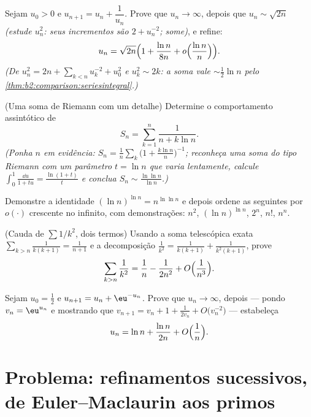 \begin{exercise}[$\star\star\star$]\label{exo:b2:comparison:8}
Sejam $u_0 > 0$ e $u_{n+1} = u_n + \dfrac{1}{u_n}$. Prove que $u_n
\to \infty$, depois que $u_n \sim \sqrt{2n}$ \emph{(estude $u_n^2$:
seus incrementos são $2 + u_n^{-2}$; some)}, e refine:
\[
u_n = \sqrt{2n}\Bigl(1 + \frac{\ln n}{8n} +
o\Bigl(\frac{\ln n}{n}\Bigr)\Bigr).
\]
\emph{(De $u_n^2 = 2n + \sum_{k<n} u_k^{-2} + u_0^2$ e $u_k^2
\sim 2k$: a soma vale $\sim \frac12\ln n$ pelo
\cref{thm:b2:comparison:seriesintegral}.)}
\end{exercise}

\begin{exercise}[$\star\star\star$]\label{exo:b2:comparison:9}
(Uma soma de Riemann com um detalhe) Determine o comportamento assintótico de
\[
S_n = \sum_{k=1}^{n} \frac{1}{n + k\ln n} .
\]
\emph{(Ponha $n$ em evidência: $S_n = \frac1n\sum_k \bigl(1 +
\frac{k\ln n}{n}\bigr)^{-1}$; reconheça uma soma do tipo Riemann com um
parâmetro $t = \ln n$ que varia lentamente, calcule $\int_0^1
\frac{\dd u}{1 + tu} = \frac{\ln(1+t)}{t}$ e conclua $S_n \sim
\frac{\ln\ln n}{\ln n}$.)}
\end{exercise}

\begin{exercise}[$\star$]\label{exo:b2:comparison:10}
Demonstre a identidade $(\ln n)^{\ln n} = n^{\ln\ln n}$ e depois ordene as
seguintes por $o(\cdot)$ crescente no infinito, com
demonstrações: $n^2$, $(\ln n)^{\ln n}$, $2^n$, $n!$, $n^n$.
\end{exercise}

\begin{exercise}[$\star\star$]\label{exo:b2:comparison:11}
(Cauda de $\sum 1/k^2$, dois termos) Usando a soma telescópica exata
$\sum_{k > n} \frac{1}{k(k+1)} = \frac{1}{n+1}$ e a
decomposição $\frac1{k^2} = \frac{1}{k(k+1)} +
\frac{1}{k^2(k+1)}$, prove
\[
\sum_{k > n} \frac{1}{k^2}
= \frac1n - \frac{1}{2n^2} + O\Bigl(\frac{1}{n^3}\Bigr).
\]
\end{exercise}

\begin{exercise}[$\star\star\star$]\label{exo:b2:comparison:12}
Sejam $u_0 = \frac12$ e $u_{n+1} = u_n + \eu^{-u_n}$. Prove que
$u_n \to \infty$, depois --- pondo $v_n = \eu^{u_n}$ e mostrando que
$v_{n+1} = v_n + 1 + \frac{1}{2v_n} + O\bigl(v_n^{-2}\bigr)$ ---
estabeleça
\[
u_n = \ln n + \frac{\ln n}{2n} + O\Bigl(\frac1n\Bigr).
\]
\end{exercise}

\section{Problema: refinamentos sucessivos, de Euler--Maclaurin aos
primos}

